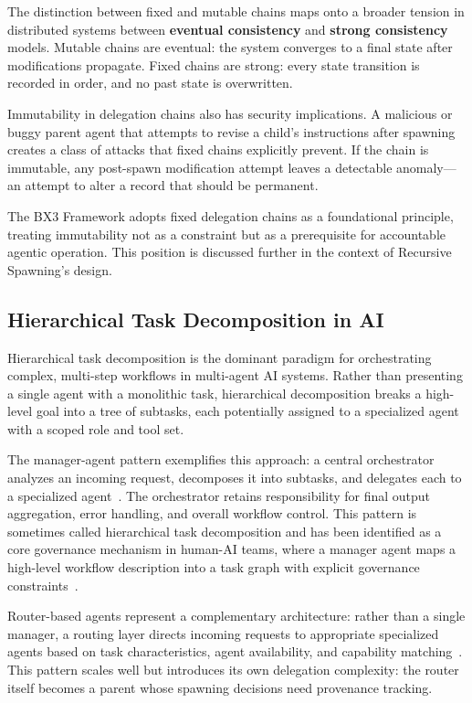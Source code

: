 The distinction between fixed and mutable chains maps onto a broader tension in distributed systems between \textbf{eventual consistency} and \textbf{strong consistency} models. Mutable chains are eventual: the system converges to a final state after modifications propagate. Fixed chains are strong: every state transition is recorded in order, and no past state is overwritten.

Immutability in delegation chains also has security implications. A malicious or buggy parent agent that attempts to revise a child's instructions after spawning creates a class of attacks that fixed chains explicitly prevent. If the chain is immutable, any post-spawn modification attempt leaves a detectable anomaly—an attempt to alter a record that should be permanent.

The BX3 Framework adopts fixed delegation chains as a foundational principle, treating immutability not as a constraint but as a prerequisite for accountable agentic operation. This position is discussed further in the context of Recursive Spawning's design.

\subsection{Hierarchical Task Decomposition in AI}

Hierarchical task decomposition is the dominant paradigm for orchestrating complex, multi-step workflows in multi-agent AI systems. Rather than presenting a single agent with a monolithic task, hierarchical decomposition breaks a high-level goal into a tree of subtasks, each potentially assigned to a specialized agent with a scoped role and tool set.

The manager-agent pattern exemplifies this approach: a central orchestrator analyzes an incoming request, decomposes it into subtasks, and delegates each to a specialized agent~\cite{azure_agent_patterns}. The orchestrator retains responsibility for final output aggregation, error handling, and overall workflow control. This pattern is sometimes called hierarchical task decomposition and has been identified as a core governance mechanism in human-AI teams, where a manager agent maps a high-level workflow description into a task graph with explicit governance constraints~\cite{acm_human_ai_teams}.

Router-based agents represent a complementary architecture: rather than a single manager, a routing layer directs incoming requests to appropriate specialized agents based on task characteristics, agent availability, and capability matching~\cite{towardsai_router}. This pattern scales well but introduces its own delegation complexity: the router itself becomes a parent whose spawning decisions need provenance tracking.

